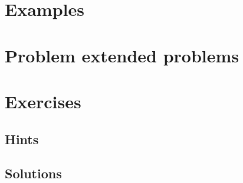 \section{Examples}



\section{Problem extended problems}






















\section{Exercises}

\ifdefined\IncludeExerciseHints
\subsection*{Hints}

\fi
\ifdefined\IncludeExerciseSolutions
\subsection*{Solutions}

\fi

